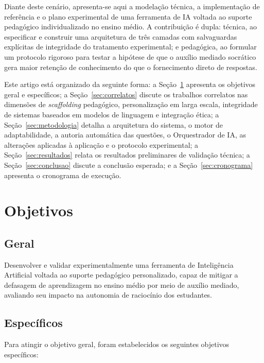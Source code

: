 \documentclass[10pt, a4paper, twocolumn]{article}
\begin{document}
Diante deste cenário, apresenta-se aqui a modelação técnica, a implementação de
referência e o plano experimental de uma ferramenta de IA voltada ao suporte
pedagógico individualizado no ensino médio. A contribuição é dupla: técnica, ao
especificar e construir uma arquitetura de três camadas com salvaguardas
explícitas de integridade do tratamento experimental; e pedagógica, ao formular
um protocolo rigoroso para testar a hipótese de que o auxílio mediado socrático
gera maior retenção de conhecimento do que o fornecimento direto de respostas.

Este artigo está organizado da seguinte forma: a Seção~\ref{sec:objetivos}
apresenta os objetivos geral e específicos; a Seção~\ref{sec:correlatos} discute
os trabalhos correlatos nas dimensões de \textit{scaffolding} pedagógico,
personalização em larga escala, integridade de sistemas baseados em modelos de
linguagem e integração ética; a Seção~\ref{sec:metodologia} detalha a arquitetura
do sistema, o motor de adaptabilidade, a autoria automática das questões, o
Orquestrador de IA, as alterações aplicadas à aplicação e o protocolo
experimental; a
Seção~\ref{sec:resultados} relata os resultados preliminares de validação
técnica; a Seção~\ref{sec:conclusao} discute a conclusão esperada; e a
Seção~\ref{sec:cronograma} apresenta o cronograma de execução.

\section{Objetivos}
\label{sec:objetivos}

\subsection{Geral}

Desenvolver e validar experimentalmente uma ferramenta de Inteligência
Artificial voltada ao suporte pedagógico personalizado, capaz de mitigar a
defasagem de aprendizagem no ensino médio por meio de auxílio mediado,
avaliando seu impacto na autonomia de raciocínio dos estudantes.

\subsection{Específicos}

Para atingir o objetivo geral, foram estabelecidos os seguintes objetivos
específicos:
\end{document}

